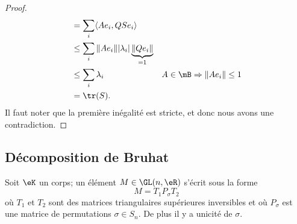 \begin{proof}
\begin{subequations}
\begin{align}
			       & =\sum_i\langle Ae_i, QSe_i\rangle                                                                      \\
			       & \leq \sum_i \| Ae_i \| | \lambda_i | \underbrace{\| Qe_i \|}_{=1}                                      \\
			       & \leq \sum_i\lambda_i                                              & A\in\mB\Rightarrow\| Ae_i \|\leq 1 \\
			       & =\tr(S).
		\end{align}
	\end{subequations}
	Il faut noter que la première inégalité est stricte, et donc nous avons une contradiction.
\end{proof}

\subsection{Décomposition de Bruhat}

\begin{theorem}    \label{ThoizlYJO}
	Soit \( \eK\) un corps; un élément \( M\in\GL(n,\eR)\) s'écrit sous la forme
	\begin{equation}
		M=T_1P_{\sigma}T_2
	\end{equation}
	où \( T_1\) et \( T_2\) sont des matrices triangulaires supérieures inversibles et où \( P_{\sigma}\) est une matrice de permutations \( \sigma\in S_n\). De plus il y a unicité de \( \sigma\).
\end{theorem}

